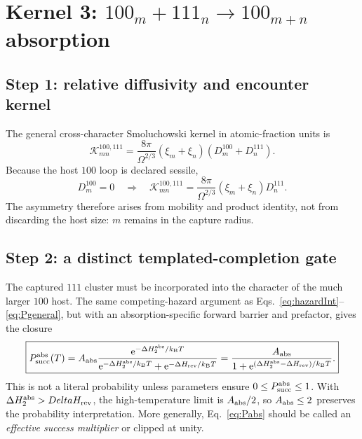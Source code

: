 \documentclass[11pt,a4paper]{article}
\newcommand{\kb}{k_{\mathrm B}}
\newcommand{\K}{\mathcal K}
\newcommand{\e}{\mathrm e}
\begin{document}
\section{Kernel 3: $100_m+111_n\rightarrow100_{m+n}$ absorption}
\label{sec:absorption}

\subsection{Step 1: relative diffusivity and encounter kernel}

The general cross-character Smoluchowski kernel in atomic-fraction units is
\begin{equation}
 \K_{mn}^{100,111}=\frac{8\pi}{\Omega^{2/3}}
 (\xi_m+\xi_n)(D_m^{100}+D_n^{111}).                                  \label{eq:Kcross}
\end{equation}
Because the host $100$ loop is declared sessile,
\begin{equation}
 D_m^{100}=0\quad\Longrightarrow\quad
 \K_{mn}^{100,111}=\frac{8\pi}{\Omega^{2/3}}
 (\xi_m+\xi_n)D_n^{111}.                                             \label{eq:KcrossSessile}
\end{equation}
The asymmetry therefore arises from mobility and product identity, not from
discarding the host size: $m$ remains in the capture radius.

\subsection{Step 2: a distinct templated-completion gate}

The captured $111$ cluster must be incorporated into the character of the much
larger $100$ host.  The same competing-hazard argument as
Eqs.~\eqref{eq:hazardInt}--\eqref{eq:Pgeneral}, but with an absorption-specific
forward barrier and prefactor, gives the closure
\begin{equation}
 \boxed{
 P_{\rm succ}^{\rm abs}(T)=A_{\rm abs}
 \frac{\e^{-\Delta H_2^{\rm abs}/\kb T}}
 {\e^{-\Delta H_2^{\rm abs}/\kb T}+\e^{-\Delta H_{\rm rev}/\kb T}}
 =\frac{A_{\rm abs}}
 {1+\e^{(\Delta H_2^{\rm abs}-\Delta H_{\rm rev})/\kb T}}.}          \label{eq:Pabs}
\end{equation}
This is not a literal probability unless parameters ensure
$0\le P_{\rm succ}^{\rm abs}\le1$.  With $\Delta H_2^{\rm abs}>Delta H_{\rm rev}$,
the high-temperature limit is $A_{\rm abs}/2$, so $A_{\rm abs}\le2$ preserves
the probability interpretation.  More generally, Eq.~\eqref{eq:Pabs} should be
called an \emph{effective success multiplier} or clipped at unity.
\end{document}
